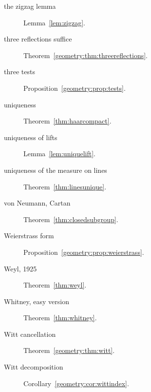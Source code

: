 \begin{description}
\item[the zigzag lemma] Lemma~\ref{lem:zigzag}.
\item[three reflections suffice] Theorem~\ref{geometry:thm:threereflections}.
\item[three tests] Proposition~\ref{geometry:prop:tests}.
\item[uniqueness] Theorem~\ref{thm:haarcompact}.
\item[uniqueness of lifts] Lemma~\ref{lem:uniquelift}.
\item[uniqueness of the measure on lines] Theorem~\ref{thm:linesunique}.
\item[von Neumann, Cartan] Theorem~\ref{thm:closedsubgroup}.
\item[Weierstrass form] Proposition~\ref{geometry:prop:weierstrass}.
\item[Weyl, 1925] Theorem~\ref{thm:weyl}.
\item[Whitney, easy version] Theorem~\ref{thm:whitney}.
\item[Witt cancellation] Theorem~\ref{geometry:thm:witt}.
\item[Witt decomposition] Corollary~\ref{geometry:cor:wittindex}.
\end{description}
